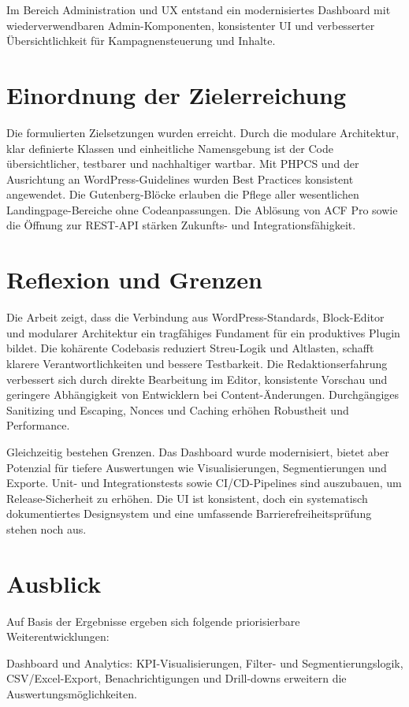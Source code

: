 Im Bereich Administration und UX entstand ein modernisiertes Dashboard mit wiederverwendbaren Admin-Komponenten, konsistenter UI und verbesserter Übersichtlichkeit für Kampagnensteuerung und Inhalte.

\section{Einordnung der Zielerreichung}
Die formulierten Zielsetzungen wurden erreicht.
Durch die modulare Architektur, klar definierte Klassen und einheitliche Namensgebung ist der Code übersichtlicher, testbarer und nachhaltiger wartbar.
Mit PHPCS und der Ausrichtung an WordPress-Guidelines wurden Best Practices konsistent angewendet.
Die Gutenberg-Blöcke erlauben die Pflege aller wesentlichen Landingpage-Bereiche ohne Codeanpassungen.
Die Ablösung von ACF Pro sowie die Öffnung zur REST-API stärken Zukunfts- und Integrationsfähigkeit.

\section{Reflexion und Grenzen}
Die Arbeit zeigt, dass die Verbindung aus WordPress-Standards, Block-Editor und modularer Architektur ein tragfähiges Fundament für ein produktives Plugin bildet.
Die kohärente Codebasis reduziert Streu-Logik und Altlasten, schafft klarere Verantwortlichkeiten und bessere Testbarkeit.
Die Redaktionserfahrung verbessert sich durch direkte Bearbeitung im Editor, konsistente Vorschau und geringere Abhängigkeit von Entwicklern bei Content-Änderungen.
Durchgängiges Sanitizing und Escaping, Nonces und Caching erhöhen Robustheit und Performance.


Gleichzeitig bestehen Grenzen.
Das Dashboard wurde modernisiert, bietet aber Potenzial für tiefere Auswertungen wie Visualisierungen, Segmentierungen und Exporte.
Unit- und Integrationstests sowie CI/CD-Pipelines sind auszubauen, um Release-Sicherheit zu erhöhen.
Die UI ist konsistent, doch ein systematisch dokumentiertes Designsystem und eine umfassende Barrierefreiheitsprüfung stehen noch aus.

\section{Ausblick}
Auf Basis der Ergebnisse ergeben sich folgende priorisierbare Weiterentwicklungen:

Dashboard und Analytics: KPI-Visualisierungen, Filter- und Segmentierungslogik, CSV/Excel-Export, Benachrichtigungen und Drill-downs erweitern die Auswertungsmöglichkeiten.

